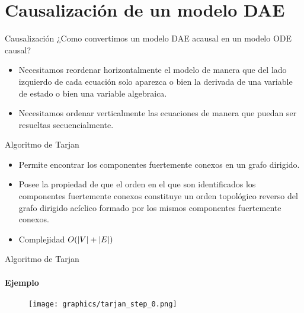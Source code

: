 \section{Causalización de un modelo DAE}

\begin{frame}{Causalización}
    ¿Como convertimos un modelo DAE acausal en un modelo ODE causal?
    \pause
    \begin{itemize}
        \item<2-> Necesitamos reordenar horizontalmente el modelo de manera que del lado izquierdo de cada ecuación solo aparezca o bien la derivada de una variable de estado o bien una variable algebraica.
        \item<3-> Necesitamos ordenar verticalmente las ecuaciones de manera que puedan ser resueltas secuencialmente.
    \end{itemize}
\end{frame}

\begin{frame}{Algoritmo de Tarjan}
    \begin{itemize}
        \item<1-> Permite encontrar los componentes fuertemente conexos en un grafo dirigido.
        \item<2-> Posee la propiedad de que el orden en el que son identificados los componentes fuertemente conexos constituye un orden topológico reverso del grafo dirigido acíclico formado por los mismos componentes fuertemente conexos.
        \item<3-> Complejidad $O(\lvert V\rvert+\lvert E\rvert)$
        
    \end{itemize}
\end{frame}

\begin{frame}{Algoritmo de Tarjan}
    \framesubtitle{Ejemplo}
    \begin{figure}
        \texttt{[image: graphics/tarjan\_step\_0.png]}
    \end{figure}
\end{frame}

